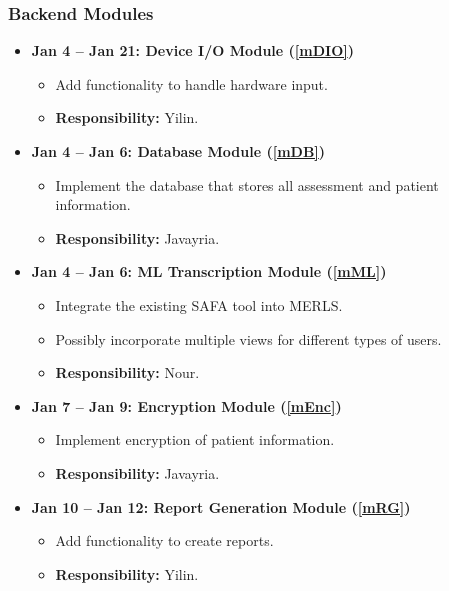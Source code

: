 \documentclass[12pt, titlepage]{article}
\begin{document}
\subsubsection{Backend Modules}
\begin{itemize}
    \item \textbf{Jan 4 -- Jan 21: Device I/O Module (\ref{mDIO})}
    \begin{itemize}
        \item Add functionality to handle hardware input.
        \item \textbf{Responsibility:} Yilin.
    \end{itemize}

    \item \textbf{Jan 4 -- Jan 6: Database Module (\ref{mDB})}
    \begin{itemize}
        \item Implement the database that stores all assessment and patient information.
        \item \textbf{Responsibility:} Javayria.
    \end{itemize}

    \item \textbf{Jan 4 -- Jan 6: ML Transcription Module (\ref{mML})}
    \begin{itemize}
        \item Integrate the existing SAFA tool into MERLS.
        \item Possibly incorporate multiple views for different types of users.
        \item \textbf{Responsibility:} Nour.
    \end{itemize}

    \item \textbf{Jan 7 -- Jan 9: Encryption Module (\ref{mEnc})}
    \begin{itemize}
        \item Implement encryption of patient information.
        \item \textbf{Responsibility:} Javayria.
    \end{itemize}

    \item \textbf{Jan 10 -- Jan 12: Report Generation Module (\ref{mRG})}
    \begin{itemize}
        \item Add functionality to create reports.
        \item \textbf{Responsibility:} Yilin.
    \end{itemize}


\end{itemize}
\end{document}
